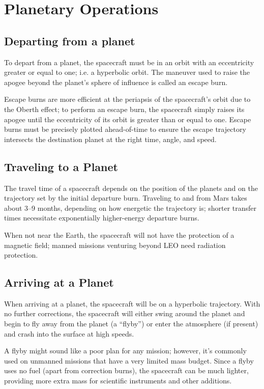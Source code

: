 
\chapter{Planetary Operations}

\section{Departing from a planet}

To depart from a planet, the spacecraft must be in an orbit with an
eccentricity greater or equal to one; i.e. a hyperbolic orbit. The
maneuver used to raise the apogee beyond the planet's sphere of
influence is called an escape burn.

Escape burns are more efficient at the periapsis of the spacecraft's
orbit due to the Oberth effect; to perform an escape burn, the
spacecraft simply raises its apogee until the eccentricity of its
orbit is greater than or equal to one. Escape burns must be precisely
plotted ahead-of-time to ensure the escape trajectory intersects the
destination planet at the right time, angle, and speed.

\section{Traveling to a Planet}

The travel time of a spacecraft depends on the position of the planets
and on the trajectory set by the initial departure burn. Traveling to
and from Mars takes about 3--9 months, depending on how energetic the
trajectory is; shorter transfer times necessitate exponentially
higher-energy departure burns.

When not near the Earth, the spacecraft will not have the protection
of a magnetic field; manned missions venturing beyond LEO need
radiation protection.

\section{Arriving at a Planet}

When arriving at a planet, the spacecraft will be on a hyperbolic
trajectory. With no further corrections, the spacecraft will either
swing around the planet and begin to fly away from the planet (a
``flyby'') or enter the atmosphere (if present) and crash into the
surface at high speeds.

A flyby might sound like a poor plan for any mission; however, it's
commonly used on unmanned missions that have a very limited mass
budget. Since a flyby uses no fuel (apart from correction burns), the
spacecraft can be much lighter, providing more extra mass for
scientific instruments and other additions.

